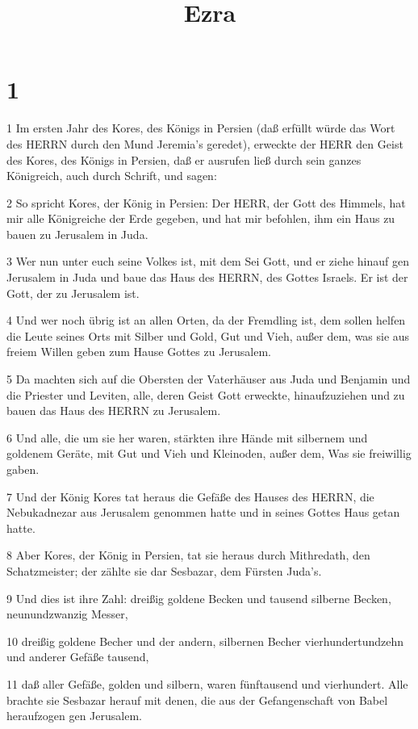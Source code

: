 

\title{Ezra}


\chapter{1}

\par 1 Im ersten Jahr des Kores, des Königs in Persien (daß erfüllt würde das Wort des HERRN durch den Mund Jeremia's geredet), erweckte der HERR den Geist des Kores, des Königs in Persien, daß er ausrufen ließ durch sein ganzes Königreich, auch durch Schrift, und sagen:
\par 2 So spricht Kores, der König in Persien: Der HERR, der Gott des Himmels, hat mir alle Königreiche der Erde gegeben, und hat mir befohlen, ihm ein Haus zu bauen zu Jerusalem in Juda.
\par 3 Wer nun unter euch seine Volkes ist, mit dem Sei Gott, und er ziehe hinauf gen Jerusalem in Juda und baue das Haus des HERRN, des Gottes Israels. Er ist der Gott, der zu Jerusalem ist.
\par 4 Und wer noch übrig ist an allen Orten, da der Fremdling ist, dem sollen helfen die Leute seines Orts mit Silber und Gold, Gut und Vieh, außer dem, was sie aus freiem Willen geben zum Hause Gottes zu Jerusalem.
\par 5 Da machten sich auf die Obersten der Vaterhäuser aus Juda und Benjamin und die Priester und Leviten, alle, deren Geist Gott erweckte, hinaufzuziehen und zu bauen das Haus des HERRN zu Jerusalem.
\par 6 Und alle, die um sie her waren, stärkten ihre Hände mit silbernem und goldenem Geräte, mit Gut und Vieh und Kleinoden, außer dem, Was sie freiwillig gaben.
\par 7 Und der König Kores tat heraus die Gefäße des Hauses des HERRN, die Nebukadnezar aus Jerusalem genommen hatte und in seines Gottes Haus getan hatte.
\par 8 Aber Kores, der König in Persien, tat sie heraus durch Mithredath, den Schatzmeister; der zählte sie dar Sesbazar, dem Fürsten Juda's.
\par 9 Und dies ist ihre Zahl: dreißig goldene Becken und tausend silberne Becken, neunundzwanzig Messer,
\par 10 dreißig goldene Becher und der andern, silbernen Becher vierhundertundzehn und anderer Gefäße tausend,
\par 11 daß aller Gefäße, golden und silbern, waren fünftausend und vierhundert. Alle brachte sie Sesbazar herauf mit denen, die aus der Gefangenschaft von Babel heraufzogen gen Jerusalem.


